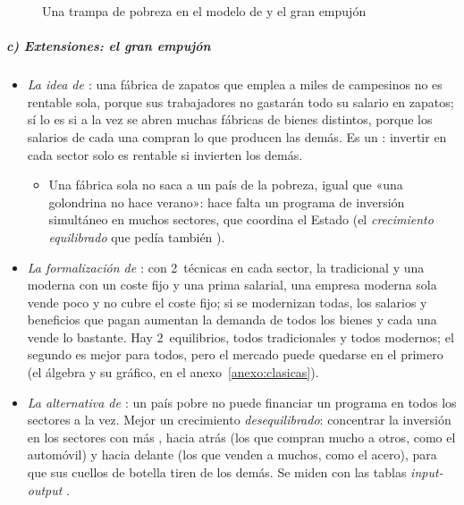 \documentclass[11pt]{article}
\begin{document}
\begin{figure}[H]
\centering
\caption{Una trampa de pobreza en el modelo de  y el gran empujón}\label{fig:trampa-pobreza}
\end{figure}


\subparagraph{c) Extensiones: el gran empujón}

\begin{itemize}
\item \emph{La idea de \textcite{RosensteinRodan1943Problems}}: una fábrica de zapatos que emplea a miles de campesinos no es rentable sola, porque sus trabajadores no gastarán todo su salario en zapatos; sí lo es si a la vez se abren muchas fábricas de bienes distintos, porque los salarios de cada una compran lo que producen las demás. Es un : invertir en cada sector solo es rentable si invierten los demás.
  \begin{itemize}
  \item Una fábrica sola no saca a un país de la pobreza, igual que «una golondrina no hace verano»: hace falta un programa de inversión simultáneo en muchos sectores, que coordina el Estado (el \emph{crecimiento equilibrado} que pedía también ).
  \end{itemize}
\item \emph{La formalización de \textcite{MurphyShleiferVishny1989Industrialization}}: con 2~técnicas en cada sector, la tradicional y una moderna con un coste fijo y una prima salarial, una empresa moderna sola vende poco y no cubre el coste fijo; si se modernizan todas, los salarios y beneficios que pagan aumentan la demanda de todos los bienes y cada una vende lo bastante. Hay 2~equilibrios, todos tradicionales y todos modernos; el segundo es mejor para todos, pero el mercado puede quedarse en el primero (el álgebra y su gráfico, en el anexo~\ref{anexo:clasicas}).
\item \emph{La alternativa de \textcite{Hirschman1958}}: un país pobre no puede financiar un programa en todos los sectores a la vez. Mejor un crecimiento \emph{desequilibrado}: concentrar la inversión en los sectores con más , hacia atrás (los que compran mucho a otros, como el automóvil) y hacia delante (los que venden a muchos, como el acero), para que sus cuellos de botella tiren de los demás. Se miden con las tablas \emph{input-output} .
\end{itemize}
\end{document}
